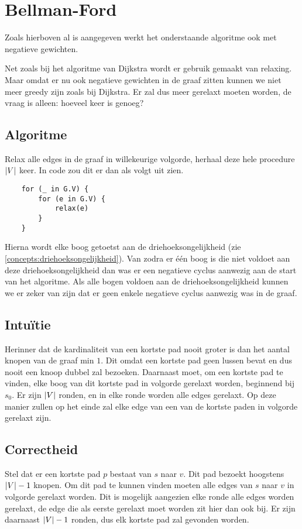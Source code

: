 \documentclass[conference]{IEEEtran}
\theoremstyle{definition}
\theoremstyle{remark}
\DeclarePairedDelimiter{\card}{\vert}{\vert}  %
\begin{document}
\section{Bellman-Ford}
Zoals hierboven al is aangegeven werkt het onderstaande algoritme ook met negatieve gewichten.

Net zoals bij het algoritme van Dijkstra wordt er gebruik gemaakt van relaxing. Maar omdat er nu ook negatieve gewichten in de graaf zitten kunnen we niet meer greedy zijn zoals bij Dijkstra. Er zal dus meer gerelaxt moeten worden, de vraag is alleen: hoeveel keer is genoeg?

\subsection{Algoritme}
Relax alle edges in de graaf in willekeurige volgorde, herhaal deze hele procedure $\card{V}$ keer.
In code zou dit er dan als volgt uit zien.
\begin{verbatim}
    for (_ in G.V) {
        for (e in G.V) {
            relax(e)
        }
    }
\end{verbatim}
Hierna wordt elke boog getoetst aan de driehoeksongelijkheid (zie \ref{concepts:driehoeksongelijkheid}). Van zodra er één boog is die niet voldoet aan deze driehoeksongelijkheid dan was er een negatieve cyclus aanwezig aan de start van het algoritme. Als alle bogen voldoen aan de driehoeksongelijkheid kunnen we er zeker van zijn dat er geen enkele negatieve cyclus aanwezig was in de graaf.

\subsection{Intuïtie}
Herinner dat de kardinaliteit van een kortste pad nooit groter is dan het aantal knopen van de graaf min $1$. Dit omdat een kortste pad geen lussen bevat en dus nooit een knoop dubbel zal bezoeken. Daarnaast moet, om een kortste pad te vinden, elke boog van dit kortste pad in volgorde gerelaxt worden, beginnend bij $s_0$. Er zijn $\card{V}$ ronden, en in elke ronde worden alle edges gerelaxt. Op deze manier zullen op het einde zal elke edge van een van de kortste paden in volgorde gerelaxt zijn.

\subsection{Correctheid}
Stel dat er een kortste pad $p$ bestaat van $s$ naar $v$. Dit pad bezoekt hoogstens $\card{V} - 1$ knopen. Om dit pad te kunnen vinden moeten alle edges van $s$ naar $v$ in volgorde gerelaxt worden. Dit is mogelijk aangezien elke ronde alle edges worden gerelaxt, de edge die als eerste gerelaxt moet worden zit hier dan ook bij. Er zijn daarnaast $\card{V} - 1$ ronden, dus elk kortste pad zal gevonden worden.
\end{document}
